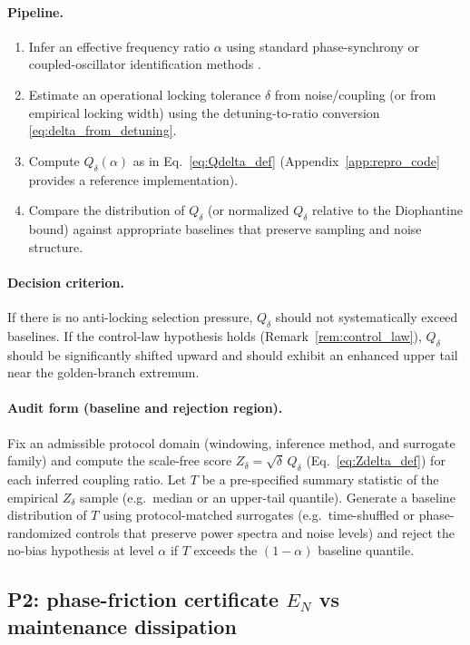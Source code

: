 \paragraph{Pipeline.}
\begin{enumerate}
  \item Infer an effective frequency ratio $\alpha$ using standard phase-synchrony or coupled-oscillator identification methods \cite{Strogatz1994,PikovskyRosenblumKurths2001}.
  \item Estimate an operational locking tolerance $\delta$ from noise/coupling (or from empirical locking width) using the detuning-to-ratio conversion \eqref{eq:delta_from_detuning}.
  \item Compute $Q_\delta(\alpha)$ as in Eq.~\eqref{eq:Qdelta_def} (Appendix~\ref{app:repro_code} provides a reference implementation).
  \item Compare the distribution of $Q_\delta$ (or normalized $Q_\delta$ relative to the Diophantine bound) against appropriate baselines that preserve sampling and noise structure.
\end{enumerate}
\paragraph{Decision criterion.}
If there is no anti-locking selection pressure, $Q_\delta$ should not systematically exceed baselines.
If the control-law hypothesis holds (Remark~\ref{rem:control_law}), $Q_\delta$ should be significantly shifted upward and should exhibit an enhanced upper tail near the golden-branch extremum.
\paragraph{Audit form (baseline and rejection region).}
Fix an admissible protocol domain (windowing, inference method, and surrogate family) and compute the scale-free score $Z_\delta=\sqrt{\delta}\,Q_\delta$ (Eq.~\eqref{eq:Zdelta_def}) for each inferred coupling ratio.
Let $T$ be a pre-specified summary statistic of the empirical $Z_\delta$ sample (e.g.\ median or an upper-tail quantile).
Generate a baseline distribution of $T$ using protocol-matched surrogates (e.g.\ time-shuffled or phase-randomized controls that preserve power spectra and noise levels) and reject the no-bias hypothesis at level $\alpha$ if $T$ exceeds the $(1-\alpha)$ baseline quantile.

\subsection{P2: phase-friction certificate \texorpdfstring{$E_N$}{EN} vs maintenance dissipation}
\label{sec:test_P2}

